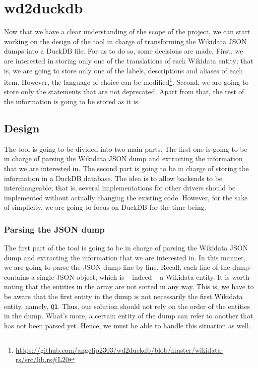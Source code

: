 \section{wd2duckdb}

Now that we have a clear understanding of the scope of the project, we can start working on the design of the tool in charge of transforming the Wikidata JSON dumps into a DuckDB file. For us to do so, some decisions are made. First, we are interested in storing only one of the translations of each Wikidata entity; that is, we are going to store only one of the labels, descriptions and aliases of each item. However, the language of choice can be modified\footnote{\url{https://github.com/angelip2303/wd2duckdb/blob/master/wikidata-rs/src/lib.rs\#L20}}. Second, we are going to store only the statements that are not deprecated. Apart from that, the rest of the information is going to be stored as it is.

\label{section:wd2duckdb_design}
\subsection{Design}

The tool is going to be divided into two main parts. The first one is going to be in charge of parsing the Wikidata JSON dump and extracting the information that we are interested in. The second part is going to be in charge of storing the information in a DuckDB database. The idea is to allow backends to be interchangeable; that is, several implementations for other drivers should be implemented without actually changing the existing code. However, for the sake of simplicity, we are going to focus on DuckDB for the time being.

\label{section:json_dump}
\subsubsection{Parsing the JSON dump}

The first part of the tool is going to be in charge of parsing the Wikidata JSON dump and extracting the information that we are interested in. In this manner, we are going to parse the JSON dump line by line. Recall, each line of the dump contains a single JSON object, which is -- indeed -- a Wikidata entity. It is worth noting that the entities in the array are not sorted in any way. This is, we have to be aware that the first entity in the dump is not necessarily the first Wikidata entity, namely, \texttt{Q1}. Thus, our solution should not rely on the order of the entities in the dump. What's more, a certain entity of the dump can refer to another that has not been parsed yet. Hence, we must be able to handle this situation as well.

